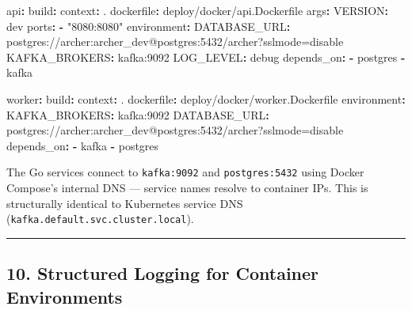 \documentclass[
]{article}
\newenvironment{Shaded}{}{}
\newcommand{\AttributeTok}[1]{\textcolor[rgb]{0.49,0.56,0.16}{#1}}
\newcommand{\FunctionTok}[1]{\textcolor[rgb]{0.02,0.16,0.49}{#1}}
\newcommand{\KeywordTok}[1]{\textcolor[rgb]{0.00,0.44,0.13}{\textbf{#1}}}
\newcommand{\StringTok}[1]{\textcolor[rgb]{0.25,0.44,0.63}{#1}}
\begin{document}
\begin{Shaded}
\begin{Highlighting}[]
\AttributeTok{  }\FunctionTok{api}\KeywordTok{:}
\AttributeTok{    }\FunctionTok{build}\KeywordTok{:}
\AttributeTok{      }\FunctionTok{context}\KeywordTok{:}\AttributeTok{ .}
\AttributeTok{      }\FunctionTok{dockerfile}\KeywordTok{:}\AttributeTok{ deploy/docker/api.Dockerfile}
\AttributeTok{      }\FunctionTok{args}\KeywordTok{:}
\AttributeTok{        }\FunctionTok{VERSION}\KeywordTok{:}\AttributeTok{ dev}
\AttributeTok{    }\FunctionTok{ports}\KeywordTok{:}
\AttributeTok{      }\KeywordTok{{-}}\AttributeTok{ }\StringTok{"8080:8080"}
\AttributeTok{    }\FunctionTok{environment}\KeywordTok{:}
\AttributeTok{      }\FunctionTok{DATABASE\_URL}\KeywordTok{:}\AttributeTok{ postgres://archer:archer\_dev@postgres:5432/archer?sslmode=disable}
\AttributeTok{      }\FunctionTok{KAFKA\_BROKERS}\KeywordTok{:}\AttributeTok{ kafka:9092}
\AttributeTok{      }\FunctionTok{LOG\_LEVEL}\KeywordTok{:}\AttributeTok{ debug}
\AttributeTok{    }\FunctionTok{depends\_on}\KeywordTok{:}
\AttributeTok{      }\KeywordTok{{-}}\AttributeTok{ postgres}
\AttributeTok{      }\KeywordTok{{-}}\AttributeTok{ kafka}

\AttributeTok{  }\FunctionTok{worker}\KeywordTok{:}
\AttributeTok{    }\FunctionTok{build}\KeywordTok{:}
\AttributeTok{      }\FunctionTok{context}\KeywordTok{:}\AttributeTok{ .}
\AttributeTok{      }\FunctionTok{dockerfile}\KeywordTok{:}\AttributeTok{ deploy/docker/worker.Dockerfile}
\AttributeTok{    }\FunctionTok{environment}\KeywordTok{:}
\AttributeTok{      }\FunctionTok{KAFKA\_BROKERS}\KeywordTok{:}\AttributeTok{ kafka:9092}
\AttributeTok{      }\FunctionTok{DATABASE\_URL}\KeywordTok{:}\AttributeTok{ postgres://archer:archer\_dev@postgres:5432/archer?sslmode=disable}
\AttributeTok{    }\FunctionTok{depends\_on}\KeywordTok{:}
\AttributeTok{      }\KeywordTok{{-}}\AttributeTok{ kafka}
\AttributeTok{      }\KeywordTok{{-}}\AttributeTok{ postgres}
\end{Highlighting}
\end{Shaded}

The Go services connect to \texttt{kafka:9092} and
\texttt{postgres:5432} using Docker Compose's internal DNS --- service
names resolve to container IPs. This is structurally identical to
Kubernetes service DNS (\texttt{kafka.default.svc.cluster.local}).

\begin{center}\rule{0.5\linewidth}{0.5pt}\end{center}

\hypertarget{structured-logging-for-container-environments}{%
\subsection{10. Structured Logging for Container
Environments}\label{structured-logging-for-container-environments}}
\end{document}
